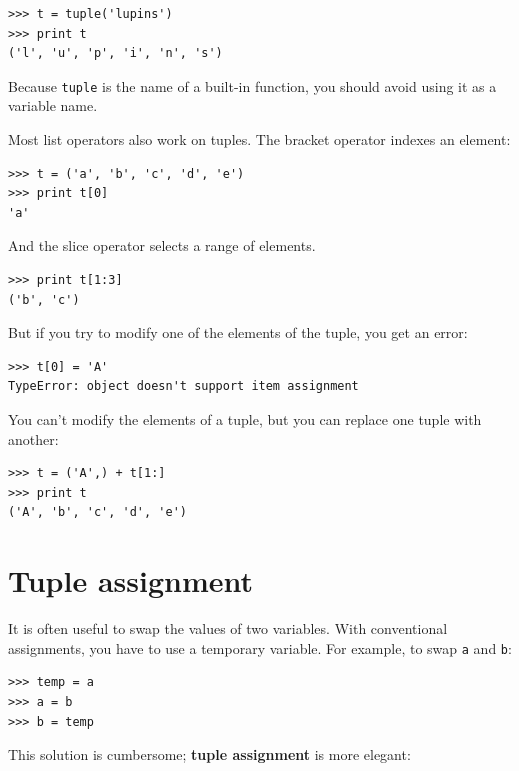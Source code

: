 \documentclass[10pt]{book}
\begin{document}
\beforeverb
\begin{verbatim}
>>> t = tuple('lupins')
>>> print t
('l', 'u', 'p', 'i', 'n', 's')
\end{verbatim}
\afterverb
%
Because {\tt tuple} is the name of a built-in function, you should
avoid using it as a variable name.

Most list operators also work on tuples.  The bracket operator
indexes an element:


\beforeverb
\begin{verbatim}
>>> t = ('a', 'b', 'c', 'd', 'e')
>>> print t[0]
'a'
\end{verbatim}
\afterverb
%
And the slice operator selects a range of elements.


\beforeverb
\begin{verbatim}
>>> print t[1:3]
('b', 'c')
\end{verbatim}
\afterverb
%
But if you try to modify one of the elements of the tuple, you get
an error:


\beforeverb
\begin{verbatim}
>>> t[0] = 'A'
TypeError: object doesn't support item assignment
\end{verbatim}
\afterverb
%
You can't modify the elements of a tuple, but you can replace
one tuple with another:

\beforeverb
\begin{verbatim}
>>> t = ('A',) + t[1:]
>>> print t
('A', 'b', 'c', 'd', 'e')
\end{verbatim}
\afterverb
%

\section{Tuple assignment}
\label{tuple assignment}


It is often useful to swap the values of two variables.
With conventional assignments, you have to use a temporary
variable.  For example, to swap {\tt a} and {\tt b}:

\beforeverb
\begin{verbatim}
>>> temp = a
>>> a = b
>>> b = temp
\end{verbatim}
\afterverb
%
This solution is cumbersome; {\bf tuple assignment} is more elegant:
\end{document}
